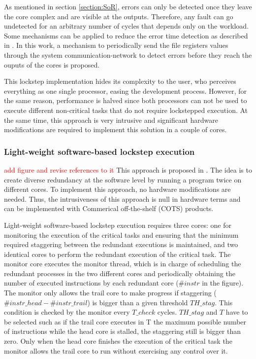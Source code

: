 As mentioned in section \ref{section:SoR}, errors can only be detected once they leave the core complex and are visible at the outputs. Therefore, any fault can go undetected for an arbitrary number of cycles that depends only on the workload. Some mechanisms can be applied to reduce the error time detection as described in \cite{hernandez2014live}. In this work, a mechanism to periodically send the file registers values through the system communication-network to detect errors before they reach the ouputs of the cores is proposed.

This lockstep implementation hides its complexity to the user, who perceives everything as one single processor, easing the development process. However, for the same reason, performance is halved since both processors can not be used to execute different non-critical tasks that do not require lockstepped execution. At the same time, this approach is very intrusive and significant hardware modifications are required to implement this solution in a couple of cores.

\subsubsection{Light-weight software-based lockstep execution}
\label{section:software_light_lockstep}

\textcolor{red}{add figure and revise references to it}
This approach is proposed in \cite{alcaide2020software}. The idea is to create diverse redundancy at the software level by running a program twice on different cores. To implement this approach, no hardware modifications are needed. Thus, the intrusiveness of this approach is null in hardware terms and can be implemented with Commerical off-the-shelf (COTS) products.

Light-weight software-based lockstep execution requires three cores: one for monitoring the execution of the critical tasks and ensuring that the minimum required staggering between the redundant executions is maintained, and two identical cores to perform the redundant execution of the critical task. The monitor core executes the monitor thread, which is in charge of scheduling the redundant processes in the two different cores and periodically obtaining the number of executed instructions by each redundant core ($\#instr$ in the figure). The monitor only allows the trail core to make progress if staggering ($\#instr\_head - \#instr\_trail$) is bigger than a given threshold $TH\_stag$. This condition is checked by the monitor every $T\_check$ cycles. $TH\_stag$ and $T$ have to be selected such as if the trail core executes in T the maximum possible number of instructions while the head core is stalled, the staggering still is bigger than zero. Only when the head core finishes the execution of the critical task the monitor allows the trail core to run without exercising any control over it. 

